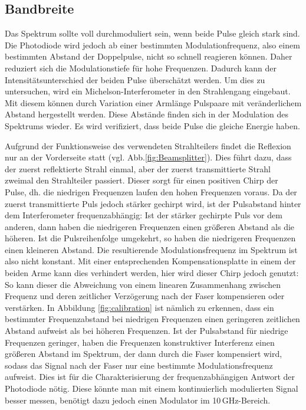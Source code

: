 \documentclass[bachelor,       %
               twoside,        %
               BCOR10mm,       %
               liststotoc,nomtotoc,bibtotoc, %
               english,ngerman, %
               final,          %
               ]{GAUBM}
\begin{document}
\subsection{Bandbreite}
Das Spektrum sollte voll durchmoduliert sein, wenn beide Pulse gleich stark sind.
Die Photodiode wird jedoch ab einer bestimmten Modulationfrequenz, also einem bestimmten Abstand der Doppelpulse, nicht so schnell reagieren können.
Daher reduziert sich die Modulationstiefe für hohe Frequenzen.
Dadurch kann der Intensitätsunterschied der beiden Pulse überschätzt werden.
Um dies zu untersuchen, wird ein Michelson-Interferometer in den Strahlengang eingebaut.
Mit diesem können durch Variation einer Armlänge Pulspaare mit veränderlichem Abstand hergestellt werden.
Diese Abstände finden sich in der Modulation des Spektrums wieder.
Es wird verifiziert, dass beide Pulse die gleiche Energie haben.

Aufgrund der Funktionsweise des verwendeten Strahlteilers findet die Reflexion nur an der Vorderseite statt (vgl. Abb.\ref{fig:Beamsplitter}).
Dies führt dazu, dass der zuerst reflektierte Strahl einmal, aber der zuerst transmittierte Strahl zweimal den Strahlteiler passiert.
Dieser sorgt für einen positiven Chirp der Pulse, dh. die niedrigen Frequenzen laufen den hohen Frequenzen voraus.
Da der zuerst transmittierte Puls jedoch stärker gechirpt wird, ist der Pulsabstand   hinter dem Interferometer frequenzabhängig: Ist der stärker gechirpte Puls vor dem anderen, dann haben die niedrigeren Frequenzen einen größeren Abstand als die höheren. Ist die Pulsreihenfolge umgekehrt, so haben die niedrigeren Frequenzen einen kleineren Abstand.
Die resultierende Modulationsfrequenz im Spektrum ist also nicht konstant.
Mit einer entsprechenden Kompensationsplatte in einem der beiden Arme kann dies verhindert werden, hier wird dieser Chirp jedoch genutzt:
So kann dieser die Abweichung von einem linearen Zusammenhang zwischen Frequenz und deren zeitlicher Verzögerung nach der Faser kompensieren oder verstärken.
In Abbildung \ref{fig:calibration} ist nämlich zu erkennen, dass ein bestimmter Frequenzabstand bei niedrigen Frequenzen einen geringeren zeitlichen Abstand aufweist als bei höheren Frequenzen.
Ist der Pulsabstand für niedrige Frequenzen geringer, haben die Frequenzen konstruktiver Interferenz einen größeren Abstand im Spektrum, der dann durch die Faser kompensiert wird, sodass das Signal nach der Faser nur eine bestimmte Modulationsfrequenz aufweist.
Dies ist für die Charakterisierung der frequenzabhängigen Antwort der Photodiode nötig.
Diese könnte man mit einem kontinuierlich modulierten Signal besser messen, benötigt dazu jedoch einen Modulator im 10\,GHz-Bereich.
\end{document}
